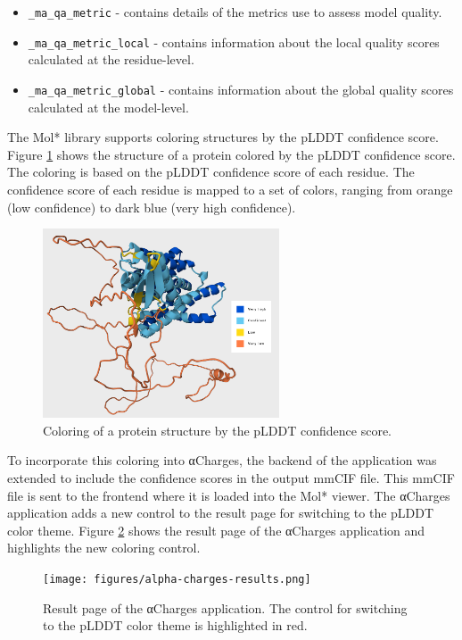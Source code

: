 \documentclass[
  digital,     %
  oneside,     %
  nosansbold,  %
  nocolorbold, %
  lof,         %
  lot,         %
]{fithesis4}
\begin{document}
\begin{itemize}
  \item \texttt{\_ma\_qa\_metric} - contains details of the metrics use to assess model quality.
  \item \texttt{\_ma\_qa\_metric\_local} - contains information about the local quality scores calculated at the residue-level.
  \item \texttt{\_ma\_qa\_metric\_global} - contains information about the global quality scores calculated at the model-level.
\end{itemize}

The Mol* library supports coloring structures by the pLDDT confidence score. Figure \ref{fig:alphafold-coloring} shows the structure of a protein colored by the pLDDT confidence score. The coloring is based on the pLDDT confidence score of each residue. The confidence score of each residue is mapped to a set of colors, ranging from orange (low confidence) to dark blue (very high confidence).

\begin{figure}[htbp]
  \begin{center}
    \includegraphics[width=7cm]{figures/alphafold_coloring.png}
  \end{center}
  \caption[Coloring by pLDDT confidence score.]{Coloring of a protein structure by the pLDDT confidence score.}
  \label{fig:alphafold-coloring}
\end{figure}

To incorporate this coloring into αCharges, the backend of the application was extended to include the confidence scores in the output mmCIF file. This mmCIF file is sent to the frontend where it is loaded into the Mol* viewer. The αCharges application adds a new control to the result page for switching to the pLDDT color theme. Figure \ref{fig:alpha-charges-results} shows the result page of the αCharges application and highlights the new coloring control.

\begin{figure}[htbp]
  \begin{center}
    \texttt{[image: figures/alpha-charges-results.png]}
  \end{center}
  \caption[Result page of the αCharges application.]{Result page of the αCharges application. The control for switching to the pLDDT color theme is highlighted in red.}
  \label{fig:alpha-charges-results}
\end{figure}
\end{document}
